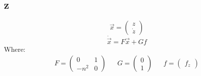 \documentclass[11pt, a4paper]{article}
\begin{document}
\subsection{z}
\begin{equation}
    \vec{x}=\begin{pmatrix}
        z\\\dot{z}
    \end{pmatrix}
\end{equation}
\begin{equation}
    \dot{\vec{x}}=F\vec{x}+Gf
\end{equation}
Where:
\begin{equation}
    \begin{matrix}
        F=\begin{pmatrix}
            0 & 1 \\
            -n^2 & 0
        \end{pmatrix} && G=\begin{pmatrix}
            0 \\
            1
        \end{pmatrix} && f=\begin{pmatrix}
            f_z
        \end{pmatrix}
    \end{matrix}
\end{equation}
\end{document}
